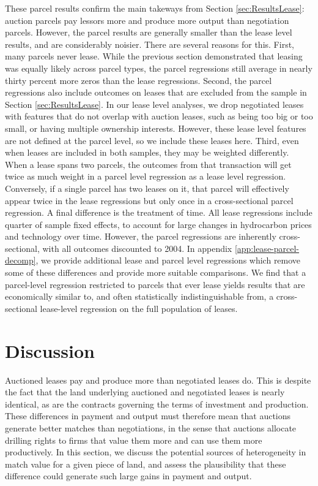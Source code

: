 \documentclass[12pt]{article}
\begin{document}
These parcel results confirm the main takeways from Section \ref{sec:ResultsLease}: auction parcels pay lessors more and produce more output than negotiation parcels. However, the parcel results are generally smaller than the lease level results, and are considerably noisier. There are several reasons for this. First, many parcels never lease. While the previous section demonstrated that leasing was equally likely across parcel types, the parcel regressions still average in nearly thirty percent more zeros than the lease regressions. Second, the parcel regressions also include outcomes on leases that are excluded from the sample in Section \ref{sec:ResultsLease}. In our lease level analyses, we drop negotiated leases with features that do not overlap with auction leases, such as being too big or too small, or having multiple ownership interests. However, these lease level features are not defined at the parcel level, so we include these leases here. Third, even when leases are included in both samples, they may be weighted differently. When a lease spans two parcels, the outcomes from that transaction will get twice as much weight in a parcel level regression as a lease level regression. Conversely, if a single parcel has two leases on it, that parcel will effectively appear twice in the lease regressions but only once in a cross-sectional parcel regression. A final difference is the treatment of time. All lease regressions include quarter of sample fixed effects, to account for large changes in hydrocarbon prices and technology over time. However, the parcel regressions are inherently cross-sectional, with all outcomes discounted to 2004. In appendix \ref{app:lease-parcel-decomp}, we provide additional lease and parcel level regressions which remove some of these differences and provide more suitable comparisons. We find that a parcel-level regression restricted to parcels that ever lease yields results that are economically similar to, and often statistically indistinguishable from, a cross-sectional lease-level regression on the full population of leases. 

\section{Discussion \label{sec:Discussion}}

Auctioned leases pay and produce more than negotiated leases do. This is despite the fact that the land underlying auctioned and negotiated leases is nearly identical, as are the contracts governing the terms of investment and production. These differences in payment and output must therefore mean that auctions generate better matches than negotiations, in the sense that auctions allocate drilling rights to firms that value them more and can use them more productively.  In this section, we discuss the potential sources of heterogeneity in match value for a given piece of land, and assess the plausibility that these difference could generate such large gains in payment and output.
\end{document}
